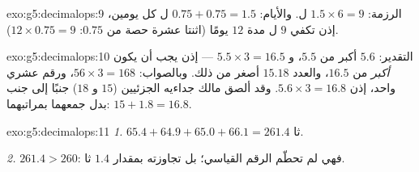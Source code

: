 \begin{solution}{exo:g5:decimalops:9}
الرزمة: $1.5 \times 6 = 9$ ل. والأيام: $0.75 + 0.75 = 1.5$ ل كل
يومين، إذن تكفي $9$ ل مدة $12$ يومًا (اثنتا عشرة حصة من $0.75$:
$12 \times 0.75 = 9$).
\end{solution}

\begin{solution}{exo:g5:decimalops:10}
التقدير: $5.6$ أكبر من $5.5$، و $5.5 \times 3 = 16.5$ --- إذن
يجب أن يكون  \emph{أكبر} من $16.5$، والعدد $15.18$ أصغر
من ذلك. وبالصواب: $56 \times 3 = 168$، ورقم عشري واحد، إذن
$5.6 \times 3 = 16.8$. وقد ألصق مالك جداءيه الجزئيين ($15$ و
$18$) جنبًا إلى جنب بدل جمعهما بمراتبهما:
$15 + 1.8 = 16.8$.
\end{solution}

\begin{solution}{exo:g5:decimalops:11}
\emph{1.} $65.4 + 64.9 + 65.0 + 66.1 = 261.4$ ثا.

\emph{2.} $261.4 > 260$: فهي لم تحطّم الرقم القياسي؛ بل تجاوزته
بمقدار $1.4$ ثا.
\end{solution}
